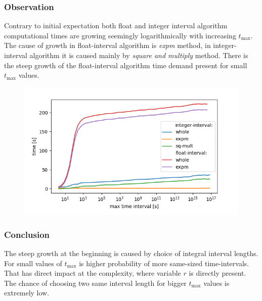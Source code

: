 \documentclass[thesis=M,english]{FITthesis}[2012/10/20]
\begin{document}
\subsubsection*{ Observation }

Contrary to initial expectation both float and integer interval algorithm computational times are growing seemingly logarithmically with increasing $t_{\max}$. The cause of growth in float-interval algorithm is \textit{expm} method, in integer-interval algorithm it is caused mainly by \textit{square and multiply} method. There is the steep growth of the float-interval algorithm time demand present for small $t_{\max}$ values.

\begin{figure}[h]
\centering
\begin{minipage}{.8\textwidth}
  \centering
  \includegraphics[width=1.0\linewidth]{img/ex2/log.png}
  \label{fig:e2log}
\end{minipage}
\end{figure}

\subsubsection*{ Conclusion }

The steep growth at the beginning is caused by choice of integral interval lengths. For small values of $t_{\max}$ is higher probability of more same-sized time-intervals. That has direct impact at the complexity, where variable $r$ is directly present. The chance of choosing two same interval length for bigger $t_{\max}$ values is extremely low.
\end{document}
